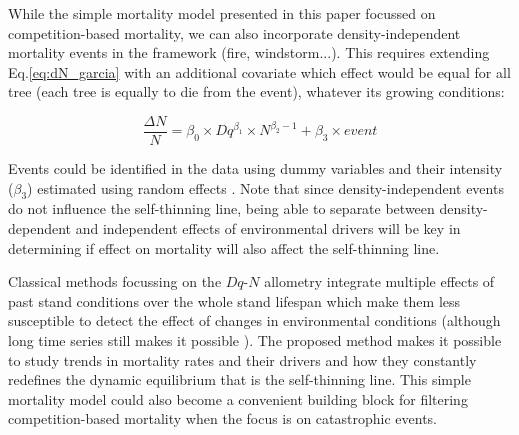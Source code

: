 \documentclass[12pt,english]{article}
\begin{document}
While the simple mortality model presented in this paper focussed on competition-based mortality, we can also incorporate density-independent mortality events in the framework (fire, windstorm...). This requires extending Eq.\ref{eq:dN_garcia} with an additional covariate which effect would be equal for all tree (each tree is equally to die from the event), whatever its growing conditions:

\begin{equation}
  \frac{\Delta N}{N} = \beta_0 \times Dq^{\beta_1} \times N^{\beta_2-1} + \beta_3 \times event 
\end{equation}

Events could be identified in the data using dummy variables and their intensity ($\beta_3$) estimated using random effects \citep{MansoMorneauNingreEtAl2015a}. Note that since density-independent events do not influence the self-thinning line, being able to separate between density-dependent and independent effects of environmental drivers will be key in determining if effect on mortality will also affect the self-thinning line. 

Classical methods focussing on the $Dq$-$N$ allometry integrate multiple effects of past stand conditions over the whole stand lifespan which make them less susceptible to detect the effect of changes in environmental conditions (although long time series still makes it possible \citep{PretzschBiberSchuetzeEtAl2014a,Zeide2001}). The proposed method makes it possible to study trends in mortality rates and their drivers and how they constantly redefines the dynamic equilibrium that is the self-thinning line. This simple mortality model could also become a convenient building block for filtering competition-based mortality when the focus is on catastrophic events. 

\newpage


\end{document}
